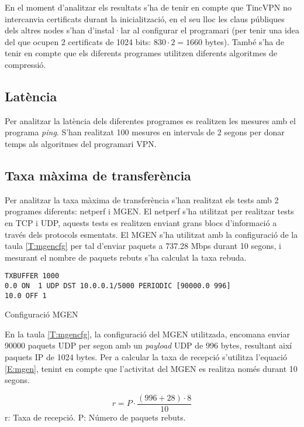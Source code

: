 En el moment d'analitzar els resultats s'ha de tenir en compte que TincVPN no intercanvia certificats durant la inicialització, en el seu lloc les claus públiques dels altres nodes s'han d'instal·lar al configurar el programari (per tenir una idea del que ocupen 2 certificats de 1024 bits: $830\cdot2=1660$ bytes).
També s'ha de tenir en compte que els diferents programes utilitzen diferents algoritmes de compressió. 

\subsection{Latència}
Per analitzar la latència dels diferentes programes es realitzen les mesures amb el programa \emph{ping}. S'han realitzat 100 mesures en intervals de 2 segons per donar temps als algoritmes del programari VPN.

\subsection{Taxa màxima de transferència}
Per analitzar la taxa màxima de transferència s'han realitzat els tests amb 2 programes diferents: netperf i MGEN.
El netperf s'ha utilitzat per realitzar tests en TCP i UDP, aquests tests es realitzen enviant grans blocs d'informació a través dels protocols esmentats.
El MGEN s'ha utilitzat amb la configuració de la taula \ref{T:mgencfg} per tal d'enviar paquets a 737.28 Mbps durant 10 segons, i mesurant el nombre de paquets rebuts s'ha calculat la taxa rebuda.
\begin{table}[htb]
\begin{center}
\begin{minipage}[htb]{0.6\linewidth}
\footnotesize
\begin{verbatim}
TXBUFFER 1000
0.0 ON  1 UDP DST 10.0.0.1/5000 PERIODIC [90000.0 996]
10.0 OFF 1
\end{verbatim}
\end{minipage}
\caption{Configuració MGEN}
\label{T:mgencfg}
\end{center}
\end{table}

En la taula \ref{T:mgencfg}, la configuració del MGEN utilitzada, encomana enviar 90000 paquets UDP per segon amb un \emph{payload} UDP de 996 bytes, resultant així paquets IP de 1024 bytes. Per a calcular la taxa de recepció s'utilitza l'equació \ref{E:mgen}, tenint en compte que l'activitat del MGEN es realitza només durant 10 segons.

\begin{minipage}[htb]{\linewidth}
\begin{equation}\label{E:mgen}
r=P\cdot\frac{(996+28)\cdot8}{10}
\end{equation}
\centering
{\scriptsize
r: Taxa de recepció. 
P: Número de paquets rebuts. 
}\\
\vspace{1em}
\end{minipage}

